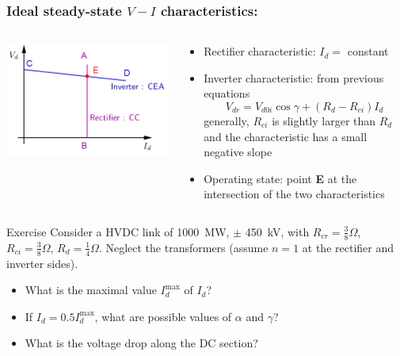 \begin{frame}
\frametitle{Ideal steady-state $V-I$ characteristics:}
\begin{columns}
\begin{column}{0.45\linewidth}
\begin{center}
    \includegraphics[width=\linewidth]{images/control1.png}
\end{center}
\end{column}
\begin{column}{0.55\linewidth}
\begin{itemize}
    \item Rectifier characteristic: $I_d = $ constant
    \item Inverter characteristic: from previous equations
    $$V_{dr}=V_{d0i}\cos \gamma +(R_d -R_{ci})I_d$$
    generally, $R_{ci}$ is slightly larger than $R_d$ and the characteristic has a small negative slope
    \item Operating state: point \textbf{E} at the intersection of the two characteristics
\end{itemize}
\end{column}
\end{columns}
\end{frame}

\begin{frame}{Exercise}
    Consider a HVDC link of  \SI{1000}{MW}, $\pm$ \SI{450}{kV}, with  $R_{cr} = \frac{3}{8} \Omega$, $R_{ci} = \frac{3}{8} \Omega$, $R_{d} = \frac{1}{4} \Omega$.
    Neglect the transformers (assume $n=1$ at the rectifier and inverter sides).
    \begin{itemize}
        \item What is the maximal value $I_d^{\max}$ of $I_d$?
        \item If $I_d = 0.5 I_d^{\max}$, what are possible values of $\alpha$ and $\gamma$?
        \item What is the voltage drop along the DC section?  
    \end{itemize}

\end{frame}

